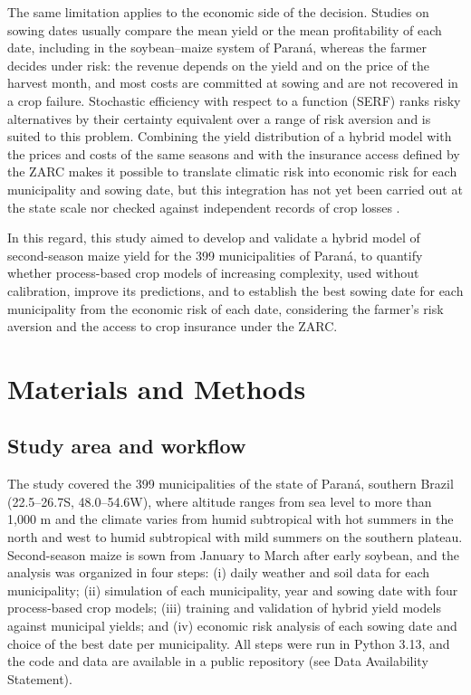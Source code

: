 \documentclass[10pt,a4paper]{article}
\begin{document}
The same limitation applies to the economic side of the decision. Studies on sowing dates usually
compare the mean yield or the mean profitability of each date, including in the soybean--maize system
of Paraná, whereas the farmer decides under risk:
the revenue depends on the yield and on the price of the harvest month, and most costs are committed
at sowing and are not recovered in a crop failure. Stochastic efficiency with respect to a function
(SERF) ranks risky alternatives by their certainty equivalent over a range of risk aversion and is
suited to this problem. Combining the yield distribution of a hybrid model with the prices and costs of
the same seasons and with the insurance access defined by the ZARC makes it possible to translate
climatic risk into economic risk for each municipality and sowing date, but this integration has not
yet been carried out at the state scale nor checked against independent records of crop losses
\citep{noia2019eja, oligini2021, hardaker2004}.

In this regard, this study aimed to develop and validate a hybrid model of second-season maize yield
for the 399 municipalities of Paraná, to quantify whether process-based crop models of increasing
complexity, used without calibration, improve its predictions, and to establish the best sowing date
for each municipality from the economic risk of each date, considering the farmer's risk aversion and
the access to crop insurance under the ZARC.


\section{Materials and Methods}
\label{sec:methods}

\subsection{Study area and workflow}
\label{subsec:area}

The study covered the 399 municipalities of the state of Paraná, southern Brazil (22.5--26.7\textdegree{}S,
48.0--54.6\textdegree{}W), where altitude ranges from sea level to more than 1,000 m and the climate varies
from humid subtropical with hot summers in the north and west to humid subtropical with mild summers on
the southern plateau. Second-season maize is sown from January to March after early soybean, and the
analysis was organized in four steps: (i) daily weather and soil data for each municipality; (ii)
simulation of each municipality, year and sowing date with four process-based crop models;
(iii) training and validation of hybrid yield models against municipal yields; and (iv) economic risk
analysis of each sowing date and choice of the best date per municipality. All steps were run in Python
3.13, and the code and data are available in a public repository (see Data Availability Statement).
\end{document}
